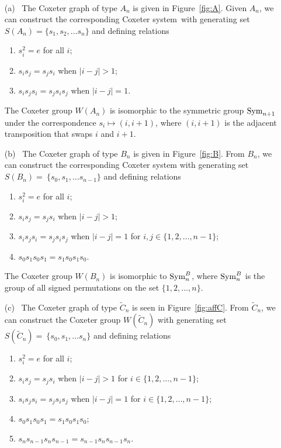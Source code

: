 \begin{example}
~
\begin{itemize}
\item[(a)~] The Coxeter graph of type $A_n$ is given in Figure~\ref{fig:A}. Given $A_n$, we can construct the corresponding Coxeter system\ with generating set $S(A_n)=\{s_1, s_2, \ldots s_n\}$ and defining relations
\begin{enumerate}
	\item $s_i^2=e$ for all $i$;
	\item $s_is_j=s_js_i$ when $|i-j|>1$;
	\item $s_is_js_i=s_js_is_j$ when $|i-j|=1.$
\end{enumerate}
The Coxeter group $W(A_n)$ is isomorphic to the symmetric group $\mathrm{Sym}_{n+1}$ under the correspondence $s_i \mapsto (i, i+1)$, where $(i, i+1)$ is the adjacent transposition that swaps $i$ and $i+1$.
\item[(b)~] The Coxeter graph of type $B_n$ is given in Figure~\ref{fig:B}. From $B_n$, we can construct the corresponding Coxeter system with generating set $S(B_n)=~\{s_0,s_1, \ldots s_{n-1}\}$ and defining relations
\begin{enumerate}
	\item $s_i^2=e$ for all $i$;
	\item $s_is_j=s_js_i$  when $|i-j|>1$;
	\item $s_is_js_i=s_js_is_j$ when $|i-j|=1$ for $i,j \in \{1,2,\ldots, n-1\}$;
	\item $s_0s_1s_0s_1=s_1s_0s_1s_0$.
\end{enumerate}
The Coxeter group $W(B_n)$ is isomorphic to $\mathrm{Sym}_n^B$, where $\mathrm{Sym}_n^B$ is the group of all signed permutations on the set $\{1,2, \ldots,n\}$. 
\item[(c)~] The Coxeter graph of type $\widetilde C_n$ is seen in Figure~\ref{fig:affC}. From $\widetilde C_n$, we can construct the Coxeter group $W(\widetilde C_n)$ with generating set $S(\widetilde{C}_n)=~\{s_0, s_1, \ldots s_n\}$ and defining relations 
\begin{enumerate}
	\item $s_i^2=e$ for all $i$;
	\item $s_is_j=s_js_i$ when $|i-j|>1$ for $i \in \{1,2, \ldots, n-1\}$;
	\item $s_is_js_i=s_js_is_j$ 	when $|i-j|=1$ for $i \in \{1,2, \ldots, n-1\}$;
	\item $s_0s_1s_0s_1=s_1s_0s_1s_0$;
	\item $s_ns_{n-1}s_ns_{n-1}=s_{n-1}s_ns_{n-1}s_n.$
\end{enumerate}
\end{itemize}
\end{example}

